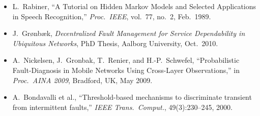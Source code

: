 \documentclass[12pt, a4paper]{article}
\begin{document}
\begin{itemize}[leftmargin=1.4em, itemsep=4pt]
  \item L.~Rabiner, ``A Tutorial on Hidden Markov Models and Selected
    Applications in Speech Recognition,'' \emph{Proc.\ IEEE}, vol.~77,
    no.~2, Feb.\ 1989.
  \item J.~Grønbæk, \emph{Decentralized Fault Management for Service
    Dependability in Ubiquitous Networks}, PhD Thesis, Aalborg University,
    Oct.\ 2010.
  \item A.~Nickelsen, J.~Gronbak, T.~Renier, and H.-P.~Schwefel,
    ``Probabilistic Fault-Diagnosis in Mobile Networks Using Cross-Layer
    Observations,'' in \emph{Proc.\ AINA 2009}, Bradford, UK, May 2009.
  \item A.~Bondavalli et al., ``Threshold-based mechanisms to discriminate
    transient from intermittent faults,'' \emph{IEEE Trans.\ Comput.},
    49(3):230--245, 2000.
\end{itemize}
\end{document}
